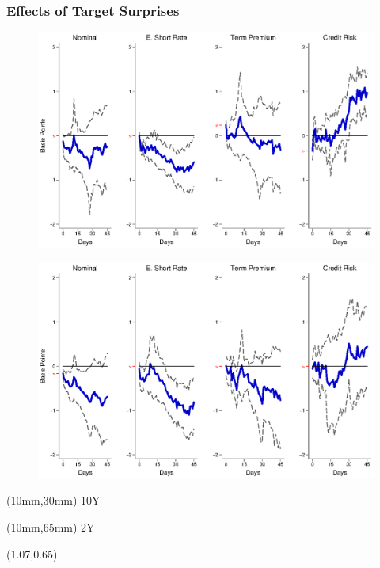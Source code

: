 \documentclass[12pt, aspectratio=169, xcolor=dvipsnames]{beamer}
\begin{document}
\begin{frame}[label=TargetEM]
\frametitle{Effects of Target Surprises}
\begin{figure}[!htbp]
\begin{center} %
\includegraphics[trim={0cm 0cm 0cm 0cm},clip,height=0.45\textheight,width=0.85\linewidth]{../Figures/LPs/LagDep-FX/Target/EM/TargetEMnomyptpphi120m.eps}
\par\end{center}
\end{figure}
\vspace{-0.5cm}
\begin{figure}[!htbp]
\begin{center} %
\includegraphics[trim={0cm 0cm 0cm 0.76cm},clip,height=0.45\textheight,width=0.85\linewidth]{../Figures/LPs/LagDep-FX/Target/EM/TargetEMnomyptpphi24m.eps}
\par\end{center}
\end{figure}
\begin{textblock*}{8mm}(10mm,30mm)
\small 10Y
\end{textblock*}
\begin{textblock*}{8mm}(10mm,65mm)
\small 2Y
\end{textblock*}
\begin{textblock*}{5cm}(1.07\textwidth,0.65\textheight)
\hyperlink{TargetUS}{}
\end{textblock*}
\end{frame}
\end{document}

